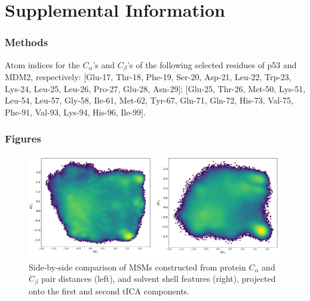 

\section{Supplemental Information}


\subsubsection{Methods}
Atom indices for the $C_{\alpha}$'s and $C_{\beta}$'s of the following selected residues of p53 and MDM2, respectively: [Glu-17, Thr-18, Phe-19, Ser-20, Asp-21, Leu-22, Trp-23, Lys-24, Leu-25, Leu-26, Pro-27, Glu-28, Asn-29]; [Glu-25, Thr-26, Met-50, Lys-51, Leu-54, Leu-57, Gly-58, Ile-61, Met-62, Tyr-67, Gln-71, Gln-72, His-73, Val-75, Phe-91, Val-93, Lys-94, His-96, Ile-99].



\subsubsection{Figures}

\begin{figure}[h!]
\centering
\includegraphics[scale=0.75]{Figures/SI/tica_compare.pdf}
\caption{Side-by-side comparison of MSMs constructed from
protein $C_{\alpha}$ and $C_{\beta}$ pair distances (left), and solvent shell features
(right), projected onto the first and second tICA components.}
\label{fig:tica_compare}
\end{figure}




